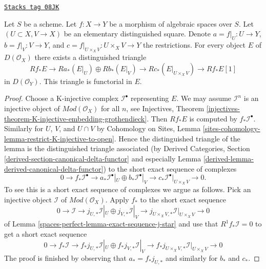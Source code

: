 \begin{lemma}
\label{spaces-perfect-lemma-unbounded-relative-mayer-vietoris}
\href{https://stacks.math.columbia.edu/tag/08JK}{\texttt{Stacks tag 08JK}}

Let $S$ be a scheme. Let $f : X \to Y$ be a morphism of algebraic spaces
over $S$. Let $(U \subset X, V \to X)$ be an elementary distinguished square.
Denote $a = f|_U : U \to Y$, $b = f|_V : V \to Y$, and
$c = f|_{U \times_X V} : U \times_X V \to Y$ the restrictions.
For every object $E$ of $D(\mathcal{O}_X)$ there exists a
distinguished triangle
$$
Rf_*E \to
Ra_*(E|_U) \oplus Rb_*(E|_V) \to
Rc_*(E|_{U \times_X V}) \to
Rf_*E[1]
$$
in $D(\mathcal{O}_Y)$. This triangle is functorial in $E$.
\end{lemma}

\begin{proof}
Choose a K-injective complex $\mathcal{I}^\bullet$
representing $E$. We may assume $\mathcal{I}^n$ is an injective
object of $\textit{Mod}(\mathcal{O}_X)$ for all $n$, see
Injectives, Theorem
\ref{injectives-theorem-K-injective-embedding-grothendieck}.
Then $Rf_*E$ is computed by $f_*\mathcal{I}^\bullet$.
Similarly for $U$, $V$, and $U \cap V$ by
Cohomology on Sites,
Lemma \ref{sites-cohomology-lemma-restrict-K-injective-to-open}.
Hence the distinguished triangle of the lemma is the distinguished
triangle associated (by
Derived Categories, Section
\ref{derived-section-canonical-delta-functor} and especially
Lemma \ref{derived-lemma-derived-canonical-delta-functor})
to the short exact sequence of complexes
$$
0 \to
f_*\mathcal{I}^\bullet \to
a_*\mathcal{I}^\bullet|_U \oplus b_*\mathcal{I}^\bullet|_V \to
c_*\mathcal{I}^\bullet|_{U \times_X V} \to
0.
$$
To see this is a short exact sequence of complexes we argue as
follows. Pick an injective object $\mathcal{I}$ of
$\textit{Mod}(\mathcal{O}_X)$. Apply $f_*$ to the short exact sequence
$$
0 \to \mathcal{I} \to
j_{U, *}\mathcal{I}|_U \oplus j_{V, *}\mathcal{I}|_V \to
j_{U \times_X V, *}\mathcal{I}|_{U \times_X V} \to 0
$$
of Lemma \ref{spaces-perfect-lemma-exact-sequence-j-star}
and use that $R^1f_*\mathcal{I} = 0$ to get a short exact sequence
$$
0 \to f_*\mathcal{I} \to
f_*j_{U, *}\mathcal{I}|_U \oplus f_*j_{V, *}\mathcal{I}|_V \to
f_*j_{U \times_X V, *}\mathcal{I}|_{U \times_X V} \to 0
$$
The proof is finished by observing that $a_* = f_*j_{U, *}$ and similarly
for $b_*$ and $c_*$.
\end{proof}

